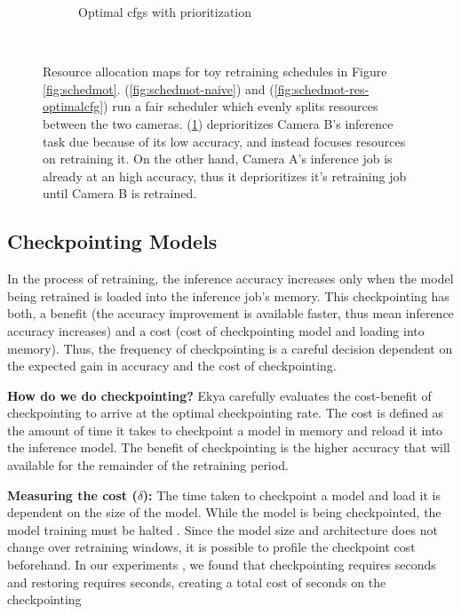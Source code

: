 \begin{figure}[t]
\begin{subfigure}[t]{0.5\columnwidth}
    \caption{\small Optimal cfgs with prioritization}
    \label{fig:schedmot-res-prioritization}
  \end{subfigure}
  ~~
  \caption{Resource allocation maps for toy retraining schedules in Figure \ref{fig:schedmot}. (\ref{fig:schedmot-naive}) and (\ref{fig:schedmot-res-optimalcfg}) run a fair scheduler which evenly splits resources between the two cameras. (\ref{fig:schedmot-res-prioritization}) deprioritizes Camera B's inference task due because of its low accuracy, and instead focuses resources on retraining it. On the other hand, Camera A's inference job is already at an high accuracy, thus it deprioritizes it's retraining job until Camera B is retrained. }
  \label{fig:schedmot-res}
\end{figure}


\subsection{Checkpointing Models}
\label{subsec:checkpoint}
In the process of retraining, the inference accuracy increases only when the model being retrained is loaded into the inference job's memory. This checkpointing has both, a benefit (the accuracy improvement is available faster, thus mean inference accuracy increases) and a cost (cost of checkpointing model and loading into memory). Thus, the frequency of checkpointing is a careful decision dependent on the expected gain in accuracy and the cost of checkpointing.  

\textbf{How do we do checkpointing?} Ekya carefully evaluates the cost-benefit of checkpointing to arrive at the optimal checkpointing rate. The cost is defined as the amount of time it takes to checkpoint a model in memory and reload it into the inference model. The benefit of checkpointing is the higher accuracy that will available for the remainder of the retraining period.

\textbf{Measuring the cost ($\delta$): } The time taken to checkpoint a model and load it is dependent on the size of the model. While the model is being checkpointed, the model training must be halted . Since the model size and architecture does not change over retraining windows, it is possible to profile the checkpoint cost beforehand. In our experiments , we found that checkpointing requires  seconds and restoring requires  seconds, creating a total cost of \romilc{$\delta$} seconds on the checkpointing 

